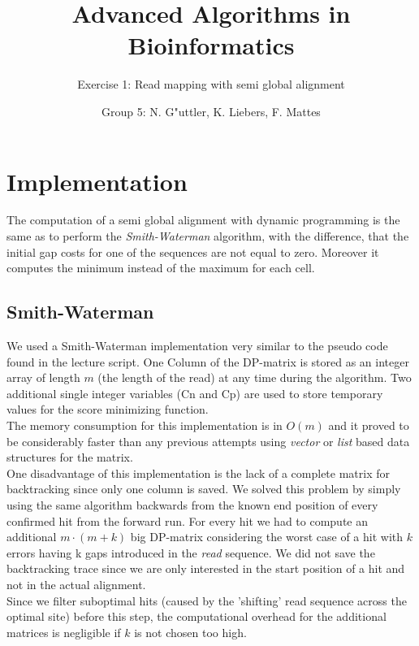 \documentclass[11pt, notitlepage]{scrartcl}
\begin{document}
         


\title{Advanced Algorithms in Bioinformatics} 
\subtitle{Exercise 1: Read mapping with semi global alignment}
\author{Group 5: N. G"uttler, K. Liebers, F. Mattes} %
\maketitle

\section{Implementation}
The computation of a semi global alignment with dynamic programming is the same as to perform the
\textit{Smith-Waterman} algorithm, with the difference, that the initial gap costs for one of the sequences are not
equal to zero. Moreover it computes the minimum instead of the maximum for each cell.\\

\subsection{Smith-Waterman}
We used a Smith-Waterman implementation very similar to the pseudo code found in the lecture script. One Column of the
DP-matrix is stored as an integer array of length $m$ (the length of the read) at any time during the algorithm. Two
additional single integer variables (Cn and Cp) are used to store temporary values for the score minimizing function.\\
The memory consumption for this implementation is in $O(m)$ and it proved to be considerably faster than any previous
attempts using {\it vector} or {\it list} based data structures for the matrix.\\
One disadvantage of this implementation is the lack of a complete matrix for backtracking since only one column is
saved. We solved this problem by simply using the same algorithm backwards from the known end position of every
confirmed hit from the forward run. For every hit we had to compute an additional $m\cdot (m+k)$ big DP-matrix
considering the worst case of a hit with $k$ errors having k gaps introduced in the {\it read} sequence. We did not save
the backtracking trace since we are only interested in the start position of a hit and not in the actual alignment. \\
Since we filter suboptimal hits (caused by the 'shifting' read sequence across the optimal site) before this step, the
computational overhead for the additional matrices is negligible if $k$ is not chosen too high.\\
 
\end{document}
